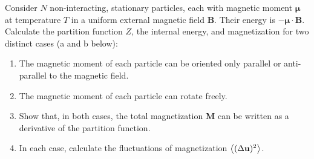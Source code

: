 Consider $N$ non-interacting, stationary particles, each with magnetic
moment $\mathbf{\mu}$ at temperature $T$ in a uniform external magnetic field
$\mathbf{B}$. Their energy is $-\mathbf{\mu}\cdot\mathbf{B}$. Calculate the partition
function $Z$, the internal energy, and magnetization for two distinct cases
(a and b below):
\begin{enumerate}
	\item
		The magnetic moment of each particle can be oriented only parallel or
		anti-parallel to the magnetic field.
	\item
		The magnetic moment of each particle can rotate freely.
	\item
		Show that, in both cases, the total magnetization $\mathbf{M}$ can be
		written as a derivative of the partition function.
	\item
		In each case, calculate the fluctuations of magnetization
		$\expval{(\Delta \mathbf{u})^2}$.
\end{enumerate}

